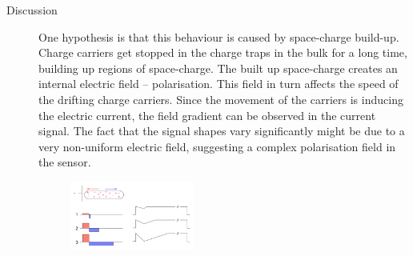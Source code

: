 \begin{description}
\item[Discussion] 

One hypothesis is that this behaviour is caused by space-charge build-up. Charge carriers get stopped in the charge traps in the bulk for a long time, building up regions of space-charge. The built up space-charge creates an internal electric field -- polarisation. This field in turn affects the speed of the drifting charge carriers. Since the movement of the carriers is inducing the electric current, the field gradient can be observed in the current signal. The fact that the signal shapes vary significantly might be due to a very non-uniform electric field, suggesting a complex polarisation field in the sensor.
\begin{figure}[!t]
\begin{center}
\includegraphics[width=0.4\textwidth]{03_measurement_results/plots/elfield}

\end{center}
\end{figure}
\end{description}
